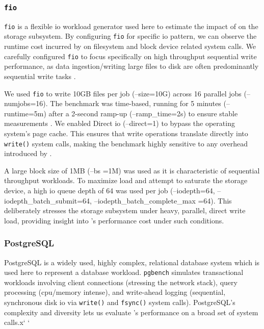 \subsubsection{\texttt{fio}}\label{subsubsec:fio-just}
\texttt{fio}  is a flexible \ac{io} workload generator used here to estimate
the impact of \af on the storage subsystem. By configuring \texttt{fio} for
specific \ac{io} pattern, we can observe the runtime cost incurred by \af on
filesystem and block device related system calls. We carefully configured
\texttt{fio} to focus specifically on high throughput sequential write
performance, as data ingestion/writing large files to disk are often 
predominantly sequential write tasks \cite{WRITES_ARE_SEQUENTIAL}.

We used \texttt{fio} to write 10GB files per job (--size=10G) across 16
parallel jobs  (--numjobs=16).  The benchmark was time-based, running for 5
minutes (--runtime=5m) after a 2-second ramp-up (--ramp\_time=2s) to ensure
stable measurements \cite{fio-docs}. We enabled Direct \ac{io} (--direct=1) to
bypass the operating system's page cache. This ensures that write operations
translate directly into \texttt{write()} system calls, making the benchmark
highly sensitive  to any overhead introduced by \af. 

A large block size of 1MB (--bs =1M) was  used as it is characteristic of
sequential throughput workloads. To maximize  load and attempt to saturate
the storage device, a high \ac{io} queue depth of 64 was used per
job  (--iodepth=64, --iodepth\_batch\_submit=64, --iodepth\_batch\_complete\_max
=64). This deliberately stresses the storage subsystem under heavy, parallel,
direct write load, providing insight into \af's performance cost under
such conditions. 

\subsubsection{PostgreSQL}\label{subsubsec:psql-just}

PostgreSQL is a widely used, highly complex, relational database system which is
used here to represent a database workload. \texttt{pgbench} simulates
transactional workloads involving client connections (stressing the network
stack), query processing (\ac{cpu}/memory intense), and write-ahead logging
(sequential, synchronous disk \ac{io} via \texttt{write()} and \texttt{fsync()}
system calls). PostgreSQL's complexity and diversity lets us evaluate \af's
performance on a broad set of system calls.x` `

